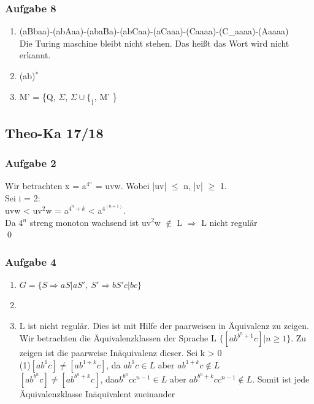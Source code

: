 \documentclass[12pt]{scrartcl}
\begin{document}
\subsubsection{Aufgabe 8}
	\begin{enumerate}
			\item (aBbaa)-(abAaa)-(abaBa)-(abCaa)-(aCaaa)-(Caaaa)-(C\_aaaa)-(Aaaaa) \\
			Die Turing maschine bleibt nicht stehen. Das heißt das Wort wird nicht erkannt.
			\item (ab)$^{*}$
			\item M' = \{Q, $\Sigma$, $\Sigma \cup \{_\}$, M' \}
	\end{enumerate}
	
\subsection{Theo-Ka 17/18}
	
\subsubsection{Aufgabe 2}
	Wir betrachten x = a$^{4{^n}}$ = uvw. Wobei |uv| $\le$ n, |v| $\ge$ 1. \\
	Sei i = 2:\\
	uvw < uv$^{2}$w = a$^{4^{n}+k}$ <  a$^{4^{(n+1)}}$. \\
	Da 4$^{n}$ streng monoton wachsend ist uv$^{2}$w $\notin$ L $\Rightarrow$ L nicht regulär \\
	\qed

\subsubsection{Aufgabe 4}
	\begin{enumerate}
		\item \(G = \{ S \Rightarrow aS| aS',\ S' \Rightarrow bS'c|bc\}\)
		\item
		\item L ist nicht regulär. Dies ist mit Hilfe der paarweisen in Äquivalenz zu zeigen.\\
		Wir betrachten die Äquivalenzklassen der Sprache L \(\{ [ab^{b^n+1}c]| n \ge 1 \}\). Zu zeigen ist die paarweise Inäquivalenz dieser. Sei k > 0\\
		(1)\( [ab^{1}c] \neq [ab^{1+k}c]\), da \(ab^{1}c \in L\) aber \(ab^{1+k}c \notin L\) \\
		\( [ab^{b^n}c] \neq [ab^{b^n+k}c]\), da\( ab^{b^n}cc^{n-1} \in L\) aber \( ab^{b^n+k}cc^{n-1} \notin L\). Somit ist jede Äquivalenzklasse Inäquivalent zueinander 
	\end{enumerate}
	
\end{document}

